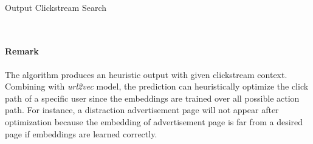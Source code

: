 ~\\

\begin{algorithm}[H]
\label{algo:optimize}
\SetAlgoLined
{}
\caption{Output Clickstream Search}
\end{algorithm}

~\\

\paragraph{Remark} The algorithm produces an heuristic output 
with given clickstream context. Combining with \emph{url2vec} model, the prediction
can heuristically optimize the click path of a specific user since the embeddings are trained 
over all possible action path. For instance, a distraction advertisement page will not appear
after optimization because the embedding of advertisement page is far from a desired page
if embeddings are learned correctly.


\cleardoublepage